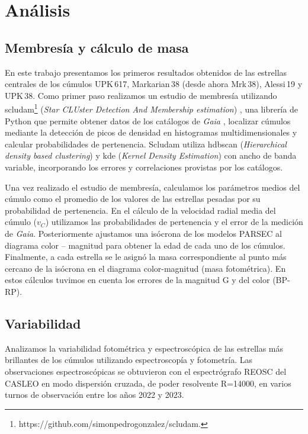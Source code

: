 \documentclass[baaa]{baaa}
\begin{document}
\section{Análisis}
\subsection{Membresía y cálculo de masa}
En este trabajo presentamos los primeros resultados obtenidos de las estrellas centrales de los cúmulos UPK\,617, Markarian\,38 (desde ahora Mrk\,38), Alessi\,19 y UPK\,38. Como primer paso realizamos un estudio de membresía utilizando {\sc scludam}\footnote{https://github.com/simonpedrogonzalez/scludam.} ({\em Star CLUster Detection And Membership estimation}) \citep{pedro}, una librería de Python que permite obtener datos de los catálogos de {\sl Gaia} \citep{2023A&A...674A...1G}, localizar cúmulos mediante la detección de picos de densidad en histogramas multidimensionales y calcular probabilidades de pertenencia. {\sc Scludam} utiliza {\sc hdbscan} ({\em Hierarchical density based clustering}) y {\sc kde}  ({\em Kernel Density Estimation}) con ancho de banda variable, incorporando los errores y correlaciones provistas por los catálogos. 

Una vez realizado el estudio de membresía, calculamos los parámetros medios del cúmulo como el promedio de los valores de las estrellas pesadas por su probabilidad de pertenencia. En el cálculo de la velocidad radial media del cúmulo ($v_C$) utilizamos las probabilidades de pertenencia y el error de la medición de {\sl Gaia}. Posteriormente ajustamos una isócrona de los modelos PARSEC  \citep{2022A&A...665A.126N} al diagrama color – magnitud para obtener la edad de cada uno de los cúmulos. Finalmente, a cada estrella se le asignó la masa correspondiente al punto más cercano de la isócrona en el diagrama color-magnitud (masa fotométrica). En estos cálculos tuvimos en cuenta los errores de la magnitud G y del color (BP-RP).

\subsection{Variabilidad}
Analizamos la variabilidad fotométrica y espectroscópica de las estrellas más brillantes de los cúmulos utilizando espectroscopía y fotometría. Las observaciones espectroscópicas se obtuvieron con el espectrógrafo REOSC del CASLEO en modo dispersión cruzada, de poder resolvente R=14000, en varios turnos de observación entre los años 2022 y 2023. 
\end{document}
